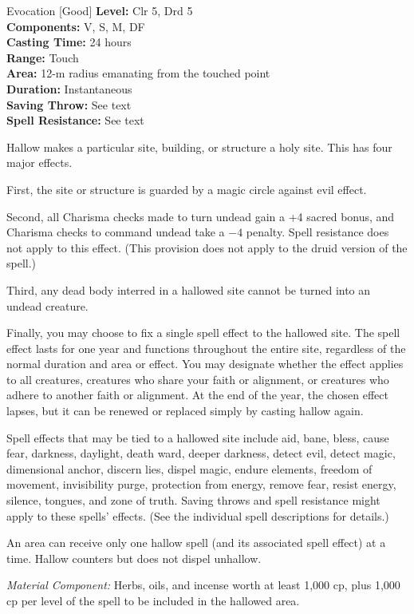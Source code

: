 {Evocation [Good]}
{
	\textbf{Level:}
	Clr 5, Drd 5\\
	\textbf{Components:}
	V, S, M, DF\\
	\textbf{Casting Time:}
	24 hours\\
	\textbf{Range:}
	Touch\\
	\textbf{Area:}
	12-m radius emanating from the touched point\\
	\textbf{Duration:}
	Instantaneous\\
	\textbf{Saving Throw:}
	See text\\
	\textbf{Spell Resistance:}
	See text\\
}
{
	Hallow makes a particular site, building, or structure a holy site. This has four major effects.

	First, the site or structure is guarded by a magic circle against evil effect.

	Second, all Charisma checks made to turn undead gain a +4 sacred bonus, and Charisma checks to command undead take a $-4$ penalty. Spell resistance does not apply to this effect. (This provision does not apply to the druid version of the spell.)

	Third, any dead body interred in a hallowed site cannot be turned into an undead creature.

	Finally, you may choose to fix a single spell effect to the hallowed site. The spell effect lasts for one year and functions throughout the entire site, regardless of the normal duration and area or effect. You may designate whether the effect applies to all creatures, creatures who share your faith or alignment, or creatures who adhere to another faith or alignment. At the end of the year, the chosen effect lapses, but it can be renewed or replaced simply by casting hallow again.

	Spell effects that may be tied to a hallowed site include aid, bane, bless, cause fear, darkness, daylight, death ward, deeper darkness, detect evil, detect magic, dimensional anchor, discern lies, dispel magic, endure elements, freedom of movement, invisibility purge, protection from energy, remove fear, resist energy, silence, tongues, and zone of truth. Saving throws and spell resistance might apply to these spells' effects. (See the individual spell descriptions for details.)

	An area can receive only one hallow spell (and its associated spell effect) at a time. Hallow counters but does not dispel unhallow.

	\textit{Material Component:}
	Herbs, oils, and incense worth at least 1,000 cp, plus 1,000 cp per level of the spell to be included in the hallowed area.

}
